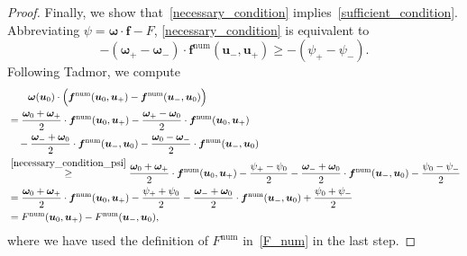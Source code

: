 \documentclass[10pt,a4paper]{amsart}
\renewcommand{\vec}[1]{\boldsymbol{#1}}
\begin{document}
\begin{proof}
Finally, we show that~\eqref{necessary_condition} implies~\eqref{sufficient_condition}.
Abbreviating $\psi = \vec{\omega} \cdot \vec{f} - F$, \eqref{necessary_condition} is equivalent to
\begin{equation}
-\left (\vec{\omega}_+ - \vec{\omega}_- \right ) \cdot \vec{f}^\mathrm{num}(\vec{u}_-, \vec{u}_+) \ge - \left(\psi_+ - \psi_-\right).
\label{necessary_condition_psi}
\end{equation}
Following Tadmor, we compute
\begin{equation}
\begin{aligned}
    &\qquad
    \vec{\omega}(\vec{u}_0) \cdot \Bigl ( \vec{f}^\mathrm{num}(\vec{u}_0, \vec{u}_+) - \vec{f}^\mathrm{num}(\vec{u}_-, \vec{u}_0) \Bigr )
    \\
    &=
    \frac{\vec{\omega}_0 + \vec{\omega}_+}{2} \cdot \vec{f}^\mathrm{num}(\vec{u}_0, \vec{u}_+)
    - \frac{\vec{\omega}_+ - \vec{\omega}_0}{2} \cdot \vec{f}^\mathrm{num}(\vec{u}_0, \vec{u}_+)
    \\
    &\quad
    - \frac{\vec{\omega}_- + \vec{\omega}_0}{2} \cdot \vec{f}^\mathrm{num}(\vec{u}_-, \vec{u}_0)
    - \frac{\vec{\omega}_0 - \vec{\omega}_-}{2} \cdot \vec{f}^\mathrm{num}(\vec{u}_-, \vec{u}_0)
    \\
    &\stackrel{\eqref{necessary_condition_psi}}{\ge}
    \frac{\vec{\omega}_0 + \vec{\omega}_+}{2} \cdot \vec{f}^\mathrm{num}(\vec{u}_0, \vec{u}_+)
    - \frac{\psi_+ - \psi_0}{2}
    - \frac{\vec{\omega}_- + \vec{\omega}_0}{2} \cdot \vec{f}^\mathrm{num}(\vec{u}_-, \vec{u}_0)
    - \frac{\psi_0 - \psi_-}{2}
    \\
    &=
    \frac{\vec{\omega}_0 + \vec{\omega}_+}{2} \cdot \vec{f}^\mathrm{num}(\vec{u}_0, \vec{u}_+)
    - \frac{\psi_+ + \psi_0}{2}
    - \frac{\vec{\omega}_- + \vec{\omega}_0}{2} \cdot \vec{f}^\mathrm{num}(\vec{u}_-, \vec{u}_0)
    + \frac{\psi_0 + \psi_-}{2}
    \\
    &=
    F^{\mathrm{num}}(\vec{u}_0, \vec{u}_+) - F^{\mathrm{num}}(\vec{u}_-, \vec{u}_0),
\end{aligned}
\end{equation}
where we have used the definition of $F^{\mathrm{num}}$ in~\eqref{F_num} in the last step.
\end{proof}
\end{document}
